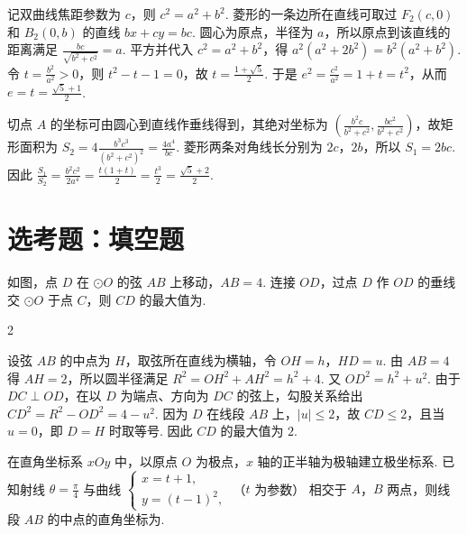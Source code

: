 \begin{solution}
记双曲线焦距参数为 \(c\)，则 \(c^2=a^2+b^2\). 菱形的一条边所在直线可取过 \(F_2(c,0)\) 和 \(B_2(0,b)\) 的直线 \(bx+cy=bc\). 圆心为原点，半径为 \(a\)，所以原点到该直线的距离满足 \(\frac{bc}{\sqrt{b^2+c^2}}=a\). 平方并代入 \(c^2=a^2+b^2\)，得 \(a^2(a^2+2b^2)=b^2(a^2+b^2)\). 令 \(t=\frac{b^2}{a^2}>0\)，则 \(t^2-t-1=0\)，故 \(t=\frac{1+\sqrt5}{2}\). 于是 \(e^2=\frac{c^2}{a^2}=1+t=t^2\)，从而 \(e=t=\frac{\sqrt5+1}{2}\).

切点 \(A\) 的坐标可由圆心到直线作垂线得到，其绝对坐标为 \(\left(\frac{b^2c}{b^2+c^2},\frac{bc^2}{b^2+c^2}\right)\)，故矩形面积为 \(S_2=4\frac{b^3c^3}{(b^2+c^2)^2}=\frac{4a^4}{bc}\). 菱形两条对角线长分别为 \(2c\)，\(2b\)，所以 \(S_1=2bc\). 因此 \(\frac{S_1}{S_2}=\frac{b^2c^2}{2a^4}=\frac{t(1+t)}{2}=\frac{t^3}{2}=\frac{\sqrt5+2}{2}\).
\end{solution}

\section{选考题：填空题}

\begin{problem}
如图，点 \(D\) 在 \(\odot O\) 的弦 \(AB\) 上移动，\(AB = 4\). 连接 \(OD\)，过点 \(D\) 作 \(OD\) 的垂线交 \(\odot O\) 于点 \(C\)，则 \(CD\) 的最大值为\fillinblank{}.

\end{problem}

\begin{answer}
2
\end{answer}

\begin{solution}
设弦 \(AB\) 的中点为 \(H\)，取弦所在直线为横轴，令 \(OH=h\)，\(HD=u\). 由 \(AB=4\) 得 \(AH=2\)，所以圆半径满足 \(R^2=OH^2+AH^2=h^2+4\). 又 \(OD^2=h^2+u^2\). 由于 \(DC\perp OD\)，在以 \(D\) 为端点、方向为 \(DC\) 的弦上，勾股关系给出 \(CD^2=R^2-OD^2=4-u^2\). 因为 \(D\) 在线段 \(AB\) 上，\(|u|\leqslant2\)，故 \(CD\leqslant2\)，且当 \(u=0\)，即 \(D=H\) 时取等号. 因此 \(CD\) 的最大值为 \(2\).
\end{solution}

\begin{problem}
在直角坐标系 \(xOy\) 中，以原点 \(O\) 为极点，\(x\) 轴的正半轴为极轴建立极坐标系. 已知射线 \(\theta = \frac{\pi}{4}\) 与曲线 \(\begin{cases}
x = t + 1,\\
y = (t - 1)^2,
\end{cases}\) （\(t\) 为参数） 相交于 \(A\)，\(B\) 两点，则线段 \(AB\) 的中点的直角坐标为\fillinblank{}.
\end{problem}

